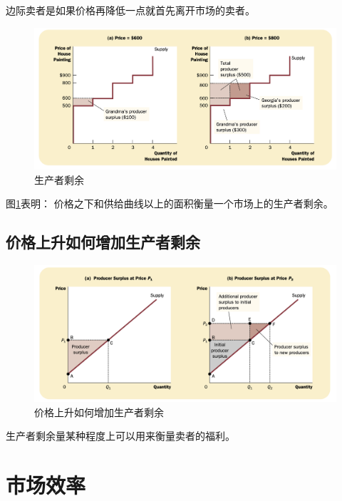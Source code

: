 边际卖者是如果价格再降低一点就首先离开市场的卖者。


\begin{figure}[!ht]
  \centering
  \includegraphics[width=\textwidth]{pics/producer-surplus}
  \caption{生产者剩余}
  \label{fig:producer-surplus}
\end{figure}

图\ref{fig:producer-surplus}表明：
价格之下和供给曲线以上的面积衡量一个市场上的生产者剩余。


\subsection{价格上升如何增加生产者剩余}

\begin{figure}[H]
  \centering
  \includegraphics[width=\textwidth]{pics/producer-surplus2}
  \caption{价格上升如何增加生产者剩余}
  \label{fig:producer-surplus2}
\end{figure}


生产者剩余量某种程度上可以用来衡量卖者的福利。


\section{市场效率}



